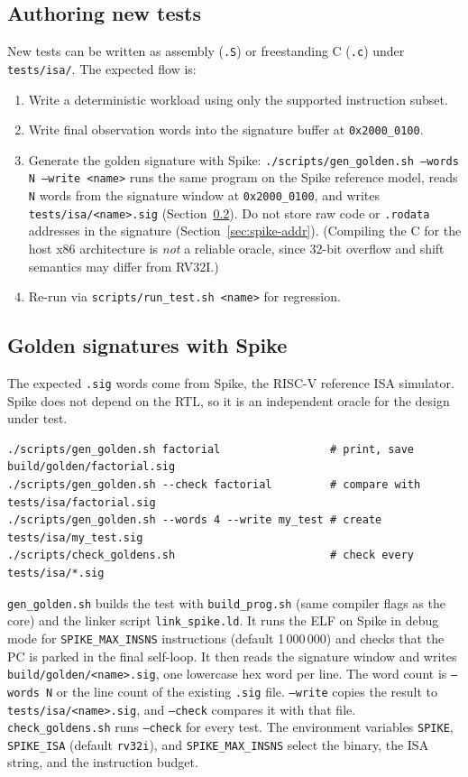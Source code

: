 \subsection{Authoring new tests}
New tests can be written as assembly (\texttt{.S}) or freestanding C
(\texttt{.c}) under \texttt{tests/isa/}. The expected flow is:
\begin{enumerate}[leftmargin=*]
  \item Write a deterministic workload using only the supported instruction subset.
  \item Write final observation words into the signature buffer at \texttt{0x2000\_0100}.
  \item Generate the golden signature with Spike:
  \texttt{./scripts/gen\_golden.sh --words N --write <name>} runs the same
  program on the Spike reference model, reads \texttt{N} words from the signature
  window at \texttt{0x2000\_0100}, and writes \texttt{tests/isa/<name>.sig}
  (Section~\ref{sec:spike-golden}). Do not store raw code or \texttt{.rodata}
  addresses in the signature (Section~\ref{sec:spike-addr}). (Compiling the C for
  the host x86 architecture is \emph{not} a reliable oracle, since 32-bit
  overflow and shift semantics may differ from RV32I.)
  \item Re-run via \texttt{scripts/run\_test.sh <name>} for regression.
\end{enumerate}

\subsection{Golden signatures with Spike}
\label{sec:spike-golden}
The expected \texttt{.sig} words come from Spike, the RISC-V reference ISA
simulator. Spike does not depend on the RTL, so it is an independent oracle for
the design under test.
\begin{lstlisting}[style=minrv]
./scripts/gen_golden.sh factorial                 # print, save build/golden/factorial.sig
./scripts/gen_golden.sh --check factorial         # compare with tests/isa/factorial.sig
./scripts/gen_golden.sh --words 4 --write my_test # create tests/isa/my_test.sig
./scripts/check_goldens.sh                        # check every tests/isa/*.sig
\end{lstlisting}
\texttt{gen\_golden.sh} builds the test with \texttt{build\_prog.sh} (same
compiler flags as the core) and the linker script \texttt{link\_spike.ld}. It
runs the ELF on Spike in debug mode for \texttt{SPIKE\_MAX\_INSNS} instructions
(default 1\,000\,000) and checks that the PC is parked in the final self-loop.
It then reads the signature window and writes \texttt{build/golden/<name>.sig},
one lowercase hex word per line. The word count is \texttt{--words N} or the
line count of the existing \texttt{.sig} file. \texttt{--write} copies the result
to \texttt{tests/isa/<name>.sig}, and \texttt{--check} compares it with that
file. \texttt{check\_goldens.sh} runs \texttt{--check} for every test. The
environment variables \texttt{SPIKE}, \texttt{SPIKE\_ISA} (default
\texttt{rv32i}), and \texttt{SPIKE\_MAX\_INSNS} select the binary, the ISA
string, and the instruction budget.

